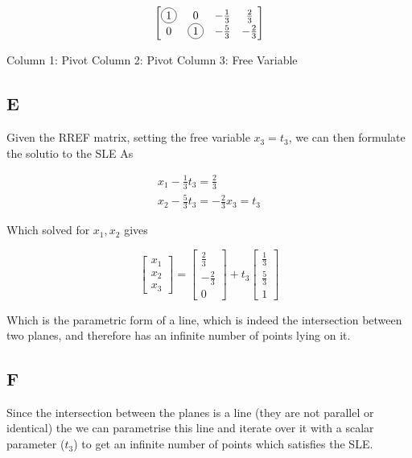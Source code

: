 \documentclass{article}
\begin{document}
\[
	\begin{bmatrix}
		\tikz[baseline=(char.base)] \node[draw,circle,inner sep=2pt] (char){1}; & 0                                                                       & -\frac{1}{3} & \frac{2}{3}  \\
		0                                                                       & \tikz[baseline=(char.base)] \node[draw,circle,inner sep=2pt] (char){1}; & -\frac{5}{3} & -\frac{2}{3}
	\end{bmatrix}
\]

Column 1: Pivot
Column 2: Pivot
Column 3: Free Variable

\subsection*{E}

Given the RREF matrix, setting the free variable $x_3 = t_3$, we can then formulate the solutio to the SLE As

\[
	\begin{aligned}
		x_1 - \frac{1}{3}t_3 = \frac{2}{3} \\
		x_2 - \frac{5}{3}t_3 = -\frac{2}{3}
		x_3 = t_3
	\end{aligned}
\]

Which solved for $x_1, x_2$ gives

\[
	\begin{bmatrix}
		x_1 \\
		x_2 \\
		x_3
	\end{bmatrix}
	=
	\begin{bmatrix}
		\frac{2}{3}  \\
		-\frac{2}{3} \\
		0
	\end{bmatrix}
	+
	t_3
	\begin{bmatrix}
		\frac{1}{3} \\
		\frac{5}{3} \\
		1
	\end{bmatrix}
\]

Which is the parametric form of a line, which is indeed the intersection between two planes, and therefore has an infinite number of points lying on it.

\subsection*{F}

Since the intersection between the planes is a line (they are not parallel or identical) the we can parametrise this line and iterate over it with a scalar parameter ($t_3$) to get an infinite number of points which satisfies the SLE.
\end{document}
